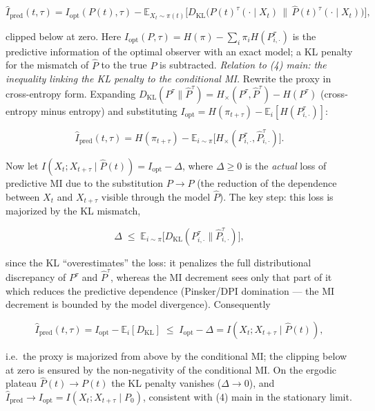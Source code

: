 \documentclass[pdflatex,sn-mathphys-ay]{sn-jnl}
\begin{document}
\[\widehat I_{\text{pred}}(t, \tau) = I_{\text{opt}}(P(t), \tau) - \mathbb{E}_{X_t \sim \pi(t)}\!\bigl[ D_{\text{KL}}\!\bigl(P(t)^\tau(\cdot \mid X_t)\,\|\,\hat{P}(t)^\tau(\cdot \mid X_t)\bigr) \bigr],\]



clipped below at zero. Here \(I_{\text{opt}}(P, \tau) = H(\pi) - \sum_i \pi_i H(P^\tau_{i,\cdot})\) is the predictive information of the optimal observer with an exact model; a KL penalty for the mismatch of \(\hat{P}\) to the true \(P\) is subtracted. \emph{Relation to (4) main: the inequality linking the KL penalty to the conditional MI.} Rewrite the proxy in cross-entropy form. Expanding \(D_{\text{KL}}(P^\tau\|\hat P^\tau) = H_\times(P^\tau,\hat P^\tau) - H(P^\tau)\) (cross-entropy minus entropy) and substituting \(I_{\text{opt}} = H(\pi_{t+\tau}) - \mathbb{E}_i[H(P^\tau_{i,\cdot})]\):



\[\widehat I_{\text{pred}}(t,\tau) = H(\pi_{t+\tau}) - \mathbb{E}_{i\sim\pi}\bigl[H_\times(P^\tau_{i,\cdot}, \hat P^\tau_{i,\cdot})\bigr].\]



Now let \(I(X_t;X_{t+\tau}\mid\hat P(t)) = I_{\text{opt}} - \Delta\), where \(\Delta \ge 0\) is the \emph{actual} loss of predictive MI due to the substitution \(P \to \hat P\) (the reduction of the dependence between \(X_t\) and \(X_{t+\tau}\) visible through the model \(\hat P\)). The key step: this loss is majorized by the KL mismatch,



\[\Delta \;\le\; \mathbb{E}_{i\sim\pi}\bigl[D_{\text{KL}}(P^\tau_{i,\cdot}\|\hat P^\tau_{i,\cdot})\bigr],\]



since the KL ``overestimates'' the loss: it penalizes the full distributional discrepancy of \(P^\tau\) and \(\hat P^\tau\), whereas the MI decrement sees only that part of it which reduces the predictive dependence (Pinsker/DPI domination --- the MI decrement is bounded by the model divergence). Consequently



\[\widehat I_{\text{pred}}(t,\tau) = I_{\text{opt}} - \mathbb{E}_i[D_{\text{KL}}] \;\le\; I_{\text{opt}} - \Delta = I(X_t; X_{t+\tau}\mid\hat P(t)),\]



i.e.~the proxy is majorized from above by the conditional MI; the clipping below at zero is ensured by the non-negativity of the conditional MI. On the ergodic plateau \(\hat P(t) \to P(t)\) the KL penalty vanishes (\(\Delta \to 0\)), and \(\widehat I_{\text{pred}} \to I_{\text{opt}} = I(X_t; X_{t+\tau}\mid P_0)\), consistent with (4) main in the stationary limit.
\end{document}
